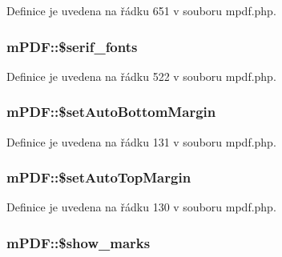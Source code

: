 Definice je uvedena na řádku 651 v souboru mpdf.\-php.

\hypertarget{classm_p_d_f_afe87ae286892d34444ae2a75e9c58ed3}{
\subsubsection[{\$serif\-\_\-fonts}]{\setlength{\rightskip}{0pt plus 5cm}m\-P\-D\-F\-::\$serif\-\_\-fonts}}\label{classm_p_d_f_afe87ae286892d34444ae2a75e9c58ed3}


Definice je uvedena na řádku 522 v souboru mpdf.\-php.

\hypertarget{classm_p_d_f_a365518381adcd0eedb819e01485a6568}{
\subsubsection[{\$set\-Auto\-Bottom\-Margin}]{\setlength{\rightskip}{0pt plus 5cm}m\-P\-D\-F\-::\$set\-Auto\-Bottom\-Margin}}\label{classm_p_d_f_a365518381adcd0eedb819e01485a6568}


Definice je uvedena na řádku 131 v souboru mpdf.\-php.

\hypertarget{classm_p_d_f_aedb2d44509c42a8c0865c6c9801a439c}{
\subsubsection[{\$set\-Auto\-Top\-Margin}]{\setlength{\rightskip}{0pt plus 5cm}m\-P\-D\-F\-::\$set\-Auto\-Top\-Margin}}\label{classm_p_d_f_aedb2d44509c42a8c0865c6c9801a439c}


Definice je uvedena na řádku 130 v souboru mpdf.\-php.

\hypertarget{classm_p_d_f_aefa8b50397cebb73857358d40fa3c567}{
\subsubsection[{\$show\-\_\-marks}]{\setlength{\rightskip}{0pt plus 5cm}m\-P\-D\-F\-::\$show\-\_\-marks}}\label{classm_p_d_f_aefa8b50397cebb73857358d40fa3c567}


